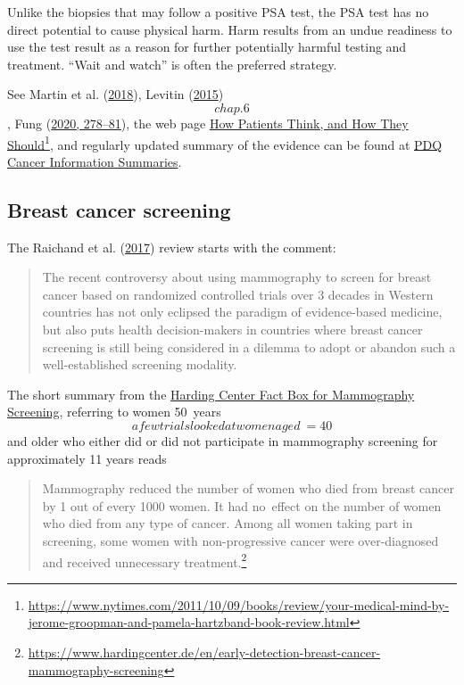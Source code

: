 \documentclass[
  10pt,
  b5paper]{book}
\begin{document}
Unlike the biopsies that may follow a positive PSA test, the PSA test
has no direct potential to cause physical harm. Harm results from an
undue readiness to use the test result as a reason for further
potentially harmful testing and treatment. ``Wait and watch'' is often the
preferred strategy.

See Martin et al. (\protect\hyperlink{ref-martin2018effect}{2018}), Levitin (\protect\hyperlink{ref-levitin_2015}{2015}) \[chap. 6\], Fung (\protect\hyperlink{ref-fung2020cancer}{2020, 278--81}), the web page \href{https://www.nytimes.com/2011/10/09/books/review/your-medical-mind-by-jerome-groopman-and-pamela-hartzband-book-review.html}{How Patients Think, and How They
Should}\footnote{\url{https://www.nytimes.com/2011/10/09/books/review/your-medical-mind-by-jerome-groopman-and-pamela-hartzband-book-review.html}}, and
regularly updated summary of the evidence can be found at
\href{https://www.ncbi.nlm.nih.gov/books/NBK65906/}{PDQ Cancer Information Summaries}.

\hypertarget{breast-cancer-screening}{%
\subsection*{Breast cancer screening}\label{breast-cancer-screening}}

The Raichand et al. (\protect\hyperlink{ref-raichand2017conclusions}{2017}) review starts with the comment:

\begin{quote}
The recent controversy about using mammography to screen for breast
cancer based on randomized controlled trials over 3 decades in Western
countries has not only eclipsed the paradigm of evidence-based
medicine, but also puts health decision-makers in countries where
breast cancer screening is still being considered in a dilemma to
adopt or abandon such a well-established screening modality.
\end{quote}

The short summary from the \href{https://www.hardingcenter.de/en/early-detection-breast-cancer-mammography-screening}{Harding Center Fact Box for Mammography
Screening},
referring to women 50~years \[a few trials looked at women aged\>=40\]
and older who either did or did not participate in mammography screening
for approximately 11 years reads

\begin{quote}
Mammography reduced the number of women who died from breast cancer by
1 out of every 1000 women. It had no~effect on the number of women who
died from any type of cancer. Among all women taking part in
screening, some women with non-progressive cancer were over-diagnosed
and received unnecessary treatment.\footnote{\url{https://www.hardingcenter.de/en/early-detection-breast-cancer-mammography-screening}}
\end{quote}
\end{document}
